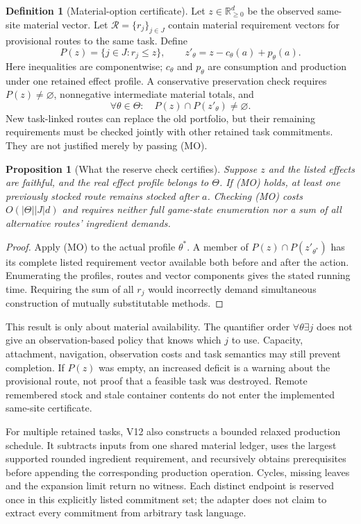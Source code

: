\documentclass[11pt]{article}
\newtheorem{proposition}[theorem]{Proposition}
\theoremstyle{definition}
\newtheorem{definition}[theorem]{Definition}
\begin{document}
\begin{definition}[Material-option certificate]
Let $z\in\mathbb{R}_{\geq0}^d$ be the observed same-site material vector. Let
$\mathcal R=\{r_j\}_{j\in J}$ contain material requirement vectors for provisional
routes to the same task. Define
\[
 P(z)=\{j\in J:r_j\leq z\},\qquad
 z'_\theta=z-c_\theta(a)+p_\theta(a).
\]
Here inequalities are componentwise; $c_\theta$ and $p_\theta$ are consumption
and production under one retained effect profile. A conservative preservation
check requires $P(z)\ne\varnothing$, nonnegative intermediate material totals,
and
\[
 \forall\theta\in\Theta:\quad P(z)\cap P(z'_\theta)\ne\varnothing.       \tag{MO}
\]
New task-linked routes can replace the old portfolio, but their remaining
requirements must be checked jointly with other retained task commitments.
They are not justified merely by passing (MO).
\end{definition}

\begin{proposition}[What the reserve check certifies]
\label{prop:material-options}
Suppose $z$ and the listed effects are faithful, and the real effect profile
belongs to $\Theta$. If (MO) holds, at least one previously stocked route
remains stocked after $a$. Checking (MO) costs $O(|\Theta||J|d)$ and requires
neither full game-state enumeration nor a sum of all alternative routes'
ingredient demands.
\end{proposition}
\begin{proof}
Apply (MO) to the actual profile $\theta^*$. A member of
$P(z)\cap P(z'_{\theta^*})$ has its complete listed requirement vector available
both before and after the action. Enumerating the profiles, routes and vector
components gives the stated running time. Requiring the sum of all $r_j$ would
incorrectly demand simultaneous construction of mutually substitutable methods.
\end{proof}

This result is only about material availability. The quantifier order
$\forall\theta\exists j$ does not give an observation-based policy that knows
which $j$ to use. Capacity, attachment, navigation, observation costs and task
semantics may still prevent completion. If $P(z)$ was empty, an increased deficit
is a warning about the provisional route, not proof that a feasible task was
destroyed. Remote remembered stock and stale container contents do not enter
the implemented same-site certificate.

For multiple retained tasks, V12 also constructs a bounded relaxed production
schedule. It subtracts inputs from one shared material ledger, uses the largest
supported rounded ingredient requirement, and recursively obtains prerequisites
before appending the corresponding production operation. Cycles, missing leaves
and the expansion limit return no witness. Each distinct endpoint is reserved
once in this explicitly listed commitment set; the adapter does not claim to
extract every commitment from arbitrary task language.
\end{document}
